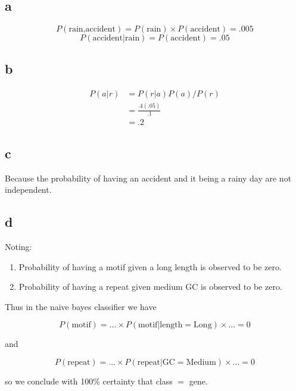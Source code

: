\documentclass[12pt,draft,a4paper]{article}
\begin{document}
\newcommand{\eqn}[1]{
\begin{equation*}
{#1}
\end{equation*}
}
\section{}
\subsection*{a}
\begin{equation*}
P(\text{rain,accident}) = P(\text{rain})\times P(\text{accident}) = .005
\end{equation*}
\begin{equation*}
P(\text{accident}|\text{rain}) = P(\text{accident}) = .05
\end{equation*}
\subsection*{b}
\begin{align*}
P(a|r) &= P(r|a)P(a)/P(r) \\
&= \frac{.4 (.05)}{.1} \\
&= .2
\end{align*}
\subsection*{c}
Because the probability of having an accident and it being a rainy day are not independent.
\subsection*{d}
Noting:
\begin{enumerate}
\item{
Probability of having a motif given a long length is observed to be zero. 
}
\item{Probability of having a repeat given medium GC is observed to be zero. 
}
\end{enumerate}
Thus in the naive bayes classifier we have 
\eqn{P(\text{motif}) = ...\times P(\text{motif}|\text{length}=\text{Long})\times ... =0}

and
\eqn{P(\text{repeat}) = ...\times P(\text{repeat}|\text{GC}=\text{Medium})\times ... =0}
so we conclude with 100\% certainty that class $=$ gene.

\pagebreak
\section{}
\end{document}
